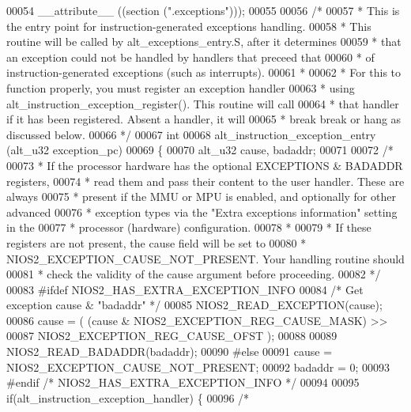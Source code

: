 \begin{DoxyCode}
00054   __attribute__ ((section (\textcolor{stringliteral}{".exceptions"})));
00055 
00056 \textcolor{comment}{/*}
00057 \textcolor{comment}{ * This is the entry point for instruction-generated exceptions handling.}
00058 \textcolor{comment}{ * This routine will be called by alt\_exceptions\_entry.S, after it determines}
00059 \textcolor{comment}{ * that an exception could not be handled by handlers that preceed that}
00060 \textcolor{comment}{ * of instruction-generated exceptions (such as interrupts).}
00061 \textcolor{comment}{ *}
00062 \textcolor{comment}{ * For this to function properly, you must register an exception handler}
00063 \textcolor{comment}{ * using alt\_instruction\_exception\_register(). This routine will call}
00064 \textcolor{comment}{ * that handler if it has been registered. Absent a handler, it will}
00065 \textcolor{comment}{ * break break or hang as discussed below.}
00066 \textcolor{comment}{ */}
00067 \textcolor{keywordtype}{int} 
00068 alt\_instruction\_exception\_entry (alt_u32 exception\_pc)
00069 \{
00070   alt_u32 cause, badaddr;
00071 
00072 \textcolor{comment}{/*}
00073 \textcolor{comment}{ * If the processor hardware has the optional EXCEPTIONS & BADADDR registers,}
00074 \textcolor{comment}{ * read them and pass their content to the user handler. These are always}
00075 \textcolor{comment}{ * present if the MMU or MPU is enabled, and optionally for other advanced}
00076 \textcolor{comment}{ * exception types via the "Extra exceptions information" setting in the}
00077 \textcolor{comment}{ * processor (hardware) configuration.}
00078 \textcolor{comment}{ *}
00079 \textcolor{comment}{ * If these registers are not present, the cause field will be set to}
00080 \textcolor{comment}{ * NIOS2\_EXCEPTION\_CAUSE\_NOT\_PRESENT. Your handling routine should}
00081 \textcolor{comment}{ * check the validity of the cause argument before proceeding.}
00082 \textcolor{comment}{ */}
00083 \textcolor{preprocessor}{#ifdef NIOS2\_HAS\_EXTRA\_EXCEPTION\_INFO}
00084   \textcolor{comment}{/* Get exception cause & "badaddr" */}
00085   NIOS2_READ_EXCEPTION(cause);
00086   cause = ( (cause & NIOS2_EXCEPTION_REG_CAUSE_MASK) >>
00087               NIOS2_EXCEPTION_REG_CAUSE_OFST );
00088 
00089   NIOS2_READ_BADADDR(badaddr);
00090 \textcolor{preprocessor}{#else}
00091   cause = NIOS2_EXCEPTION_CAUSE_NOT_PRESENT;
00092   badaddr = 0;
00093 \textcolor{preprocessor}{#endif }\textcolor{comment}{/* NIOS2\_HAS\_EXTRA\_EXCEPTION\_INFO */}\textcolor{preprocessor}{}
00094 
00095   \textcolor{keywordflow}{if}(alt_instruction_exception_handler) \{
00096     \textcolor{comment}{/*}

\end{DoxyCode}
